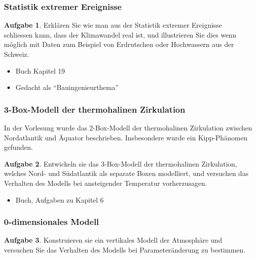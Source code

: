 %
%
%
\theoremstyle{definition}
\newtheorem{aufgabe}{Aufgabe}



\begin{frame}
\frametitle{Statistik extremer Ereignisse}

\begin{aufgabe}
Erklären Sie wie man aus der Statistik extremer Ereignisse schliessen
kann, dass der Klimawandel real ist, und illustrieren Sie dies wenn
möglich mit Daten zum Beispiel von Erdrutschen oder Hochwassern aus
der Schweiz.
\end{aufgabe}

\begin{itemize}
\item Buch Kapitel 19
\item Gedacht als ``Bauingenieurthema''
\end{itemize}

\end{frame}

\begin{frame}
\frametitle{3-Box-Modell der thermohalinen Zirkulation}

In der Vorlesung wurde das 2-Box-Modell der thermohalinen Zirkulation
zwischen Nordatlantik und Äquator beschrieben.
Insbesondere wurde ein Kipp-Phänomen gefunden.

\begin{aufgabe}
Entwickeln sie das 3-Box-Modell der thermohalinen Zirkulation, welches
Nord- und Südatlantik als separate Boxen modelliert, und versuchen das
Verhalten des Modells bei ansteigender Temperatur vorherzusagen.
\end{aufgabe}

\begin{itemize}
\item Buch, Aufgaben zu Kapitel 6
\end{itemize}

\end{frame}

\begin{frame}
\frametitle{0-dimensionales Modell}

\begin{aufgabe}
Konstruieren sie ein vertikales Modell der Atmosphäre und versuchen
Sie das Verhalten des Modells bei Parameteränderung zu bestimmen.
\end{aufgabe}
\end{frame}

